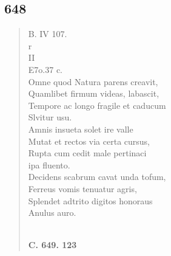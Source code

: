 \documentclass[11pt, a4paper]{report}
\begin{document}
            \subsection*{648}
      \begin{verse}
      B. IV 107. \\ r \\ II \\ E7o.37 c. \\ Omne quod Natura parens creavit, \\ Quamlibet firmum videas, labascit, \\ Tempore ac longo fragile et caducum \\ Slvitur usu. \\ Amnis insueta solet ire valle \\ Mutat et rectos via certa cursus, \\ Rupta cum cedit male pertinaci \\ ipa fluento. \\ Decidens scabrum cavat unda tofum, \\ Ferreus vomis tenuatur agris, \\ Splendet adtrito digitos honoraus \\ Anulus auro. \\ 
        ﻿\pagebreak 
    \begin{center} \textbf{C. 649. 123} \end{center} \marginpar{[117]} 
      \end{verse}
  
\end{document}
